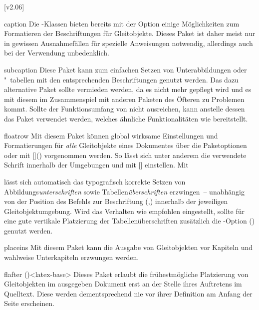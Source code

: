 [v2.06]
%
%
\begin{packages}
\item[caption]
  Die \KOMAScript-Klassen bieten bereits mit der Option 
  einige Möglichkeiten zum Formatieren 
  der Beschriftungen für Gleitobjekte. Dieses Paket ist daher meist nur in 
  gewissen Ausnahmefällen für spezielle Anweisungen notwendig, allerdings auch 
  bei der Verwendung unbedenklich.
\item[subcaption]
  Diese Paket kann zum einfachen Setzen von Unterabbildungen oder "~tabellen 
  mit den entsprechenden Beschriftungen genutzt werden. Das dazu alternative 
  Paket  sollte vermieden werden, da es nicht mehr gepflegt 
  wird und es mit diesem im Zusammenspiel mit anderen Paketen des Öfteren zu 
  Problemen kommt. Sollte der Funktionsumfang von  nicht 
  ausreichen, kann anstelle dessen das Paket  verwendet 
  werden, welches ähnliche Funktionalitäten wie  bereitstellt.
\item[floatrow]
  Mit diesem Paket können global wirksame Einstellungen und Formatierungen für 
  \emph{alle} Gleitobjekte eines Dokumentes über die Paketoptionen oder mit 
  [\MPValue{\dots}]() vorgenommen werden. 
  So lässt sich unter anderem die verwendete Schrift innerhalb der Umgebungen 
   und  mit  
  [] einstellen. Mit 
  \begin{Code}
  \end{Code}\vspace{-\baselineskip}%
  lässt sich automatisch das typografisch korrekte Setzen von 
  Abbildungs\emph{unterschriften} sowie Tabellen\emph{überschriften} 
  erzwingen~-- unabhängig von der Position des Befehls zur Beschriftung 
  (,) innerhalb der 
  jeweiligen Gleitobjektumgebung. Wird das Verhalten wie empfohlen eingestellt, 
  sollte für eine gute vertikale Platzierung der Tabellenüberschriften 
  zusätzlich die \KOMAScript-Option 
  () genutzt werden.
\item[placeins]
  Mit diesem Paket kann die Ausgabe von Gleitobjekten vor Kapiteln und wahlweise
  Unterkapiteln erzwungen werden.
\item[flafter]()<latex-base>
  Dieses Paket erlaubt die frühestmögliche Platzierung von Gleitobjekten im 
  ausgegeben Dokument erst an der Stelle ihres Auftretens im Quelltext. Diese 
  werden dementsprechend nie vor ihrer Definition am Anfang der Seite 
  erscheinen.
\end{packages}
